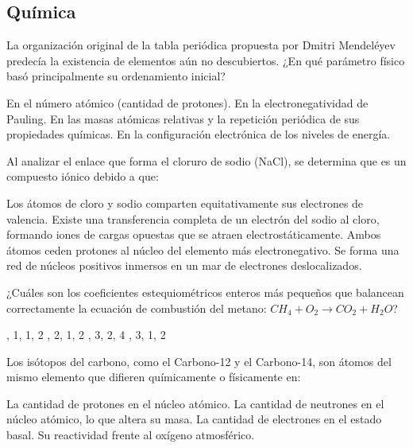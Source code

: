 \documentclass[12pt]{evaluasep}
\begin{document}
\begin{questions}
      \subsection{Química}

      \question La organización original de la tabla periódica propuesta por Dmitri Mendeléyev predecía la existencia de elementos aún no descubiertos. ¿En qué parámetro físico basó principalmente su ordenamiento inicial?
    \begin{choices}
        \choice En el número atómico (cantidad de protones).
        \choice En la electronegatividad de Pauling.
        \CorrectChoice En las masas atómicas relativas y la repetición periódica de sus propiedades químicas.
        \choice En la configuración electrónica de los niveles de energía.
    \end{choices}

    \question Al analizar el enlace que forma el cloruro de sodio (NaCl), se determina que es un compuesto iónico debido a que:
    \begin{choices}
        \choice Los átomos de cloro y sodio comparten equitativamente sus electrones de valencia.
        \CorrectChoice Existe una transferencia completa de un electrón del sodio al cloro, formando iones de cargas opuestas que se atraen electrostáticamente.
        \choice Ambos átomos ceden protones al núcleo del elemento más electronegativo.
        \choice Se forma una red de núcleos positivos inmersos en un mar de electrones deslocalizados.
    \end{choices}

    \question ¿Cuáles son los coeficientes estequiométricos enteros más pequeños que balancean correctamente la ecuación de combustión del metano: $CH_4 + O_2 \rightarrow CO_2 + H_2O$?
    \begin{choices}
        , 1, 1, 2
        , 2, 1, 2
        , 3, 2, 4
        , 3, 1, 2
    \end{choices}

    \question Los isótopos del carbono, como el Carbono-12 y el Carbono-14, son átomos del mismo elemento que difieren químicamente o físicamente en:
    \begin{choices}
        \choice La cantidad de protones en el núcleo atómico.
        \CorrectChoice La cantidad de neutrones en el núcleo atómico, lo que altera su masa.
        \choice La cantidad de electrones en el estado basal.
        \choice Su reactividad frente al oxígeno atmosférico.
    \end{choices}


\end{questions}
\end{document}
